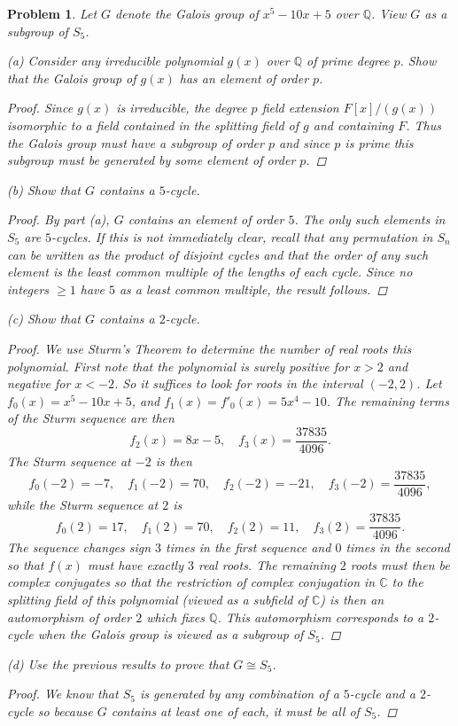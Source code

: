 \documentclass[11pt]{article}
\newcommand{\C}{\mathbb{C}}
\newcommand{\1}{\textbf{1}}
\newtheorem{prob}{Problem}
\begin{document}
\begin{prob}
Let $G$ denote the Galois group of $x^5-10x +5$ over $\mathbb{Q}$. View $G$ as a subgroup of $S_5$.  

\noindent (a) Consider any irreducible polynomial $g(x)$ over $\mathbb{Q}$ of prime degree $p$. Show that the Galois group of $g(x)$ has an element of order $p$. 

\begin{proof}
Since $g(x)$ is irreducible, the degree $p$ field extension $F[x]/(g(x))$ isomorphic to a field contained in the splitting field of $g$ and containing $F$. Thus the Galois group must have a subgroup of order $p$ and since $p$ is prime this subgroup must be generated by some element of order $p$. 
\end{proof}

\noindent (b) Show that $G$ contains a $5$-cycle. 

\begin{proof}
By part (a), $G$ contains an element of order $5$. The only such elements in $S_5$ are $5$-cycles. If this is not immediately clear, recall that any permutation in $S_n$ can be written as the product of disjoint cycles and that the order of any such element is the least common multiple of the lengths of each cycle. Since no integers $\geq 1$ have $5$ as a least common multiple, the result follows. 
\end{proof}

\noindent (c) Show that $G$ contains a $2$-cycle. 

\begin{proof}
We use Sturm's Theorem to determine the number of real roots this polynomial. First note that the polynomial is surely positive for $x>2$ and negative for $x < -2$. So it suffices to look for roots in the interval $(-2,2)$. Let $f_0(x) = x^5-10x + 5$, and $f_1(x) = f'_0(x) = 5x^4 - 10$. The remaining terms of the Sturm sequence are then  \[f_2(x) = 8x - 5, \quad f_3(x) = \frac{37835}{4096}. \] The Sturm sequence at $-2$ is then \[f_0(-2) = -7,\quad f_1(-2) = 70,\quad f_2(-2) = -21,\quad f_3(-2) =  \frac{37835}{4096},\] while the Sturm sequence at $2$ is \[f_0(2) = 17,\quad f_1(2) = 70,\quad f_2(2) = 11,\quad f_3(2) =  \frac{37835}{4096}.\] The sequence changes sign $3$ times in the first sequence and $0$ times in the second so that $f(x)$ must have exactly $3$ real roots. The remaining $2$ roots must then be complex conjugates so that the restriction of complex conjugation in $\C$ to the splitting field of this polynomial (viewed as a subfield of $\C$) is then an automorphism of order $2$ which fixes $\mathbb{Q}$. This automorphism corresponds to a $2$-cycle when the Galois group is viewed as a subgroup of $S_5$.  
\end{proof}

\noindent (d) Use the previous results to prove that $G\cong S_5$. 

\begin{proof}
We know that $S_5$ is generated by any combination of a $5$-cycle and a $2$-cycle so because $G$ contains at least one of each, it must be all of $S_5$. 
\end{proof}

\end{prob}
\pagebreak
\end{document}
